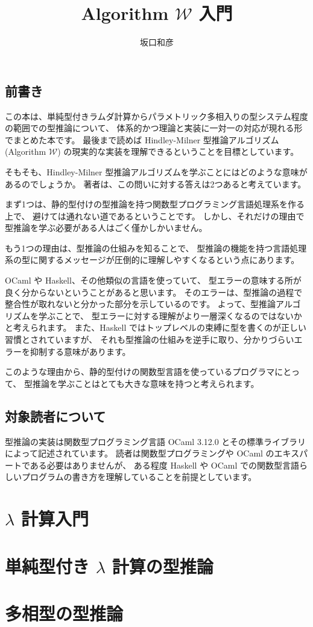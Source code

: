 \documentclass[b5paper]{jsbook}
\title{Algorithm $\mathcal W$ 入門}
\author{坂口和彦}
\theoremstyle{break}
\begin{document}
\maketitle


\section*{前書き}

この本は、単純型付きラムダ計算からパラメトリック多相入りの型システム程度の範囲での型推論について、
体系的かつ理論と実装に一対一の対応が現れる形でまとめた本です。
最後まで読めば Hindley-Milner 型推論アルゴリズム(Algorithm $\mathcal W$)
の現実的な実装を理解できるということを目標としています。

そもそも、Hindley-Milner 型推論アルゴリズムを学ぶことにはどのような意味があるのでしょうか。
著者は、この問いに対する答えは2つあると考えています。

まず1つは、静的型付けの型推論を持つ関数型プログラミング言語処理系を作る上で、
避けては通れない道であるということです。
しかし、それだけの理由で型推論を学ぶ必要がある人はごく僅かしかいません。

もう1つの理由は、型推論の仕組みを知ることで、
型推論の機能を持つ言語処理系の型に関するメッセージが圧倒的に理解しやすくなるという点にあります。

OCaml や Haskell、その他類似の言語を使っていて、
型エラーの意味する所が良く分からないということがあると思います。
そのエラーは、型推論の過程で整合性が取れないと分かった部分を示しているのです。
よって、型推論アルゴリズムを学ぶことで、
型エラーに対する理解がより一層深くなるのではないかと考えられます。
また、Haskell ではトップレベルの束縛に型を書くのが正しい習慣とされていますが、
それも型推論の仕組みを逆手に取り、分かりづらいエラーを抑制する意味があります。

このような理由から、静的型付けの関数型言語を使っているプログラマにとって、
型推論を学ぶことはとても大きな意味を持つと考えられます。

\section*{対象読者について}

型推論の実装は関数型プログラミング言語 OCaml 3.12.0
とその標準ライブラリによって記述されています。
読者は関数型プログラミングや OCaml のエキスパートである必要はありませんが、
ある程度 Haskell や OCaml での関数型言語らしいプログラムの書き方を理解していることを前提としています。

\tableofcontents

\newpage


\chapter{$\lambda$ 計算入門}



\chapter{単純型付き $\lambda$ 計算の型推論}



\chapter{多相型の型推論}


\end{document}
